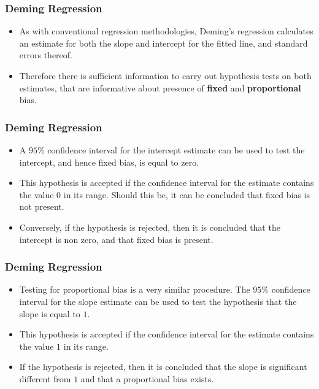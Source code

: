 \documentclass[compress]{beamer}        %
\begin{document}
\begin{frame}
\frametitle{Deming Regression}
\large
\begin{itemize}
\item As with conventional regression methodologies, Deming's regression
calculates an estimate for both the slope and intercept for the
fitted line, and standard errors thereof. 
\item Therefore there is
sufficient information to carry out hypothesis tests on both
estimates, that are informative about presence of \textbf{fixed} and
\textbf{proportional} bias.
\end{itemize}
\end{frame}
\begin{frame}
\frametitle{Deming Regression}
\large
\begin{itemize}
\item A $95\%$ confidence interval for the intercept estimate can be
used to test the intercept, and hence fixed bias, is equal to
zero. 
\item This hypothesis is accepted if the confidence interval for
the estimate contains the value $0$ in its range. Should this be,
it can be concluded that fixed bias is not present. 
\item Conversely, if
the hypothesis is rejected, then it is concluded that the
intercept is non zero, and that fixed bias is present.
\end{itemize}
\end{frame}
\begin{frame}
\frametitle{Deming Regression}
\large
\begin{itemize}
\item Testing for proportional bias is a very similar procedure. The
$95\%$ confidence interval for the slope estimate can be used to
test the hypothesis that the slope is equal to $1$. 
\item This
hypothesis is accepted if the confidence interval for the estimate
contains the value $1$ in its range. 
\item If the hypothesis is
rejected, then it is concluded that the slope is significant
different from $1$ and that a proportional bias exists.
\end{itemize}
\end{frame}
\end{document}
